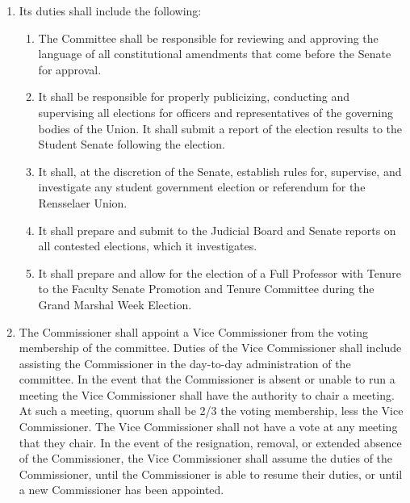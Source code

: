 \begin{enumerate}
\begin{enumerate}
\begin{enumerate}
    \item All members must be Activity Fee paying students. All members, with the exception of the chair, shall serve through the end of the spring semester, until replaced, or until resigned, whichever comes first. The chair shall serve until they resign or are replaced.
    \item Quorum for the Elections Commission shall be 2/3 of the total membership.
    \item A member of the Elections Commission who is a candidate for Grand Marshal, President of the Union or joins a political party or is a candidate assistant, as defined by the Student Senate or the Elections Commission, will automatically be removed from the Elections Commission.
    \end{enumerate}
  \item Its duties shall include the following:
    \begin{enumerate}
    \item The Committee shall be responsible for reviewing and approving the language of all constitutional amendments that come before the Senate for approval.
    \item It shall be responsible for properly publicizing, conducting and supervising all elections for officers and representatives of the governing bodies of the Union. It shall submit a report of the election results to the Student Senate following the election.
    \item It shall, at the discretion of the Senate, establish rules for, supervise, and investigate any student government election or referendum for the Rensselaer Union.
    \item It shall prepare and submit to the Judicial Board and Senate reports on all contested elections, which it investigates.
    \item It shall prepare and allow for the election of a Full Professor with Tenure to the Faculty Senate Promotion and Tenure Committee during the Grand Marshal Week Election.
    \end{enumerate}
  \item The Commissioner shall appoint a Vice Commissioner from the voting membership of the committee. Duties of the Vice Commissioner shall include assisting the Commissioner in the day-to-day administration of the committee. In the event that the Commissioner is absent or unable to run a meeting the Vice Commissioner shall have the authority to chair a meeting. At such a meeting, quorum shall be 2/3 the voting membership, less the Vice Commissioner. The Vice Commissioner shall not have a vote at any meeting that they chair. In the event of the resignation, removal, or extended absence of the Commissioner, the Vice Commissioner shall assume the duties of the Commissioner, until the Commissioner is able to resume their duties, or until a new Commissioner has been appointed.

\end{enumerate}
\end{enumerate}

